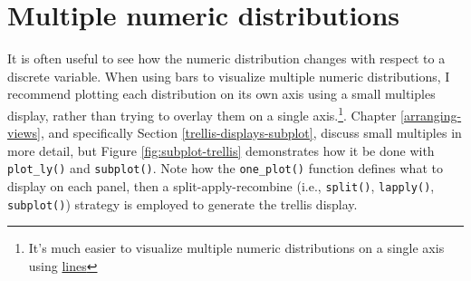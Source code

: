 \documentclass[
  12pt,
]{krantz}
\newenvironment{Shaded}{\begin{snugshade}}{\end{snugshade}}
\newcommand{\ControlFlowTok}[1]{\textcolor[rgb]{0.13,0.29,0.53}{\textbf{#1}}}
\newcommand{\DataTypeTok}[1]{\textcolor[rgb]{0.13,0.29,0.53}{#1}}
\newcommand{\DecValTok}[1]{\textcolor[rgb]{0.00,0.00,0.81}{#1}}
\newcommand{\FloatTok}[1]{\textcolor[rgb]{0.00,0.00,0.81}{#1}}
\newcommand{\KeywordTok}[1]{\textcolor[rgb]{0.13,0.29,0.53}{\textbf{#1}}}
\newcommand{\NormalTok}[1]{#1}
\newcommand{\OperatorTok}[1]{\textcolor[rgb]{0.81,0.36,0.00}{\textbf{#1}}}
\newcommand{\OtherTok}[1]{\textcolor[rgb]{0.56,0.35,0.01}{#1}}
\newcommand{\StringTok}[1]{\textcolor[rgb]{0.31,0.60,0.02}{#1}}
\begin{document}
\hypertarget{multiple-numeric-distributions}{%
\section{Multiple numeric distributions}\label{multiple-numeric-distributions}}

It is often useful to see how the numeric distribution changes with respect to a discrete variable. When using bars to visualize multiple numeric distributions, I recommend plotting each distribution on its own axis using a small multiples display, rather than trying to overlay them on a single axis.\footnote{It's much easier to visualize multiple numeric distributions on a single axis using \protect\hyperlink{lines}{lines}}. Chapter \ref{arranging-views}, and specifically Section \ref{trellis-displays-subplot}, discuss small multiples in more detail, but Figure \ref{fig:subplot-trellis} demonstrates how it be done with \texttt{plot\_ly()} and \texttt{subplot()}. Note how the \texttt{one\_plot()} function defines what to display on each panel, then a split-apply-recombine (i.e., \texttt{split()}, \texttt{lapply()}, \texttt{subplot()}) strategy is employed to generate the trellis display.


\begin{Shaded}
\end{Shaded}
\end{document}
